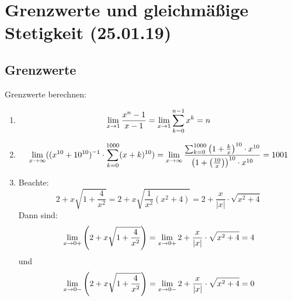 \documentclass[../ana1u.tex]{subfiles}
\begin{document}
\setcounter{section}{10}

\section{Grenzwerte und gleichmäßige Stetigkeit (25.01.19)}
\subsection{Grenzwerte}
\begin{bsp}
    Grenzwerte berechnen:
    \begin{enumerate}
        \item
            \[\lim\limits_{x\rightarrow 1} \frac{x^n-1}{x-1} = \lim\limits_{x\rightarrow 1} \sum_{k=0}^{n-1} x^k = n \]
        \item
            \[\limes{x} ((x^{10}+10^{10})^{\minus{1}} \cdot \sum_{k=0}^{1000} (x+k)^{10}) 
            = \limes{x} \frac{\sum_{k=0}^{1000} \left(1+\frac{k}{x}\right)^{10} \cdot x^{10}}
            {\left(1+\left(\frac{10}{x}\right)\right)^{10} \cdot x^{10}} = 1001 \]
        \item 
            Beachte:
            \[2+x\sqrt{1+\frac{4}{x^2}} = 2+x\sqrt{\frac{1}{x^2}(x^2+4)} 
            = 2 + \frac{x}{|x|} \cdot \sqrt{x^2+4}\]
            Dann sind:
            \[\lim\limits_{x\rightarrow 0+} \left(2+x\sqrt{1+\frac{4}{x^2}}\right)
            =\lim\limits_{x\rightarrow 0+} 2 + \frac{x}{|x|} \cdot \sqrt{x^2+4} = 4 \]
            und 
            \[\lim\limits_{x\rightarrow 0-} \left(2+x\sqrt{1+\frac{4}{x^2}}\right)
            =\lim\limits_{x\rightarrow 0-} 2 + \frac{x}{|x|} \cdot \sqrt{x^2+4} = 0 \]
    \end{enumerate}
\end{bsp}
\end{document}
